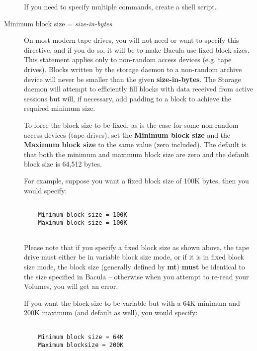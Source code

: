 \begin{description}
  If you need to specify multiple commands, create a shell script.

\item [Minimum block size = {\it size-in-bytes}]
   On most modern tape drives, you will not need or want to specify this
   directive, and if you do so, it will be to make Bacula use fixed block
   sizes.  This statement applies only to non-random access devices (e.g.
   tape drives).  Blocks written by the storage daemon to a non-random
   archive device will never be smaller than the given {\bf size-in-bytes}.
   The Storage daemon will attempt to efficiently fill blocks with data
   received from active sessions but will, if necessary, add padding to a
   block to achieve the required minimum size.
   
   To force the block size to be fixed, as is the case for some non-random
   access devices (tape drives), set the {\bf Minimum block size} and the
   {\bf Maximum block size} to the same value (zero included).  The default
   is that both the minimum and maximum block size are zero and the default
   block size is 64,512 bytes. 
   
   For  example, suppose you want a fixed block size of 100K bytes, then you 
   would specify:  

\footnotesize
\begin{verbatim}
 
    Minimum block size = 100K
    Maximum block size = 100K
    
\end{verbatim}
\normalsize

   Please note that if you specify a fixed block size as shown above,  the tape
   drive must either be in variable block size mode, or  if it is in fixed block
   size mode, the block size (generally  defined by {\bf mt}) {\bf must} be
   identical to the size specified  in Bacula -- otherwise when you attempt to
   re-read your Volumes,  you will get an error.  
   
   If you want the  block size to be variable but with a 64K minimum and 200K
   maximum (and  default as well), you would specify:  

\footnotesize
\begin{verbatim}
 
    Minimum block size = 64K
    Maximum blocksize = 200K
   
\end{verbatim}
\normalsize


\end{description}

